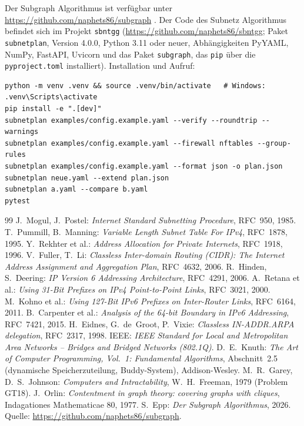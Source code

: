 \documentclass[a4paper,12pt, twoside]{report}
\theoremstyle{definition}
\begin{document}
Der Subgraph Algorithmus ist verfügbar unter \url{https://github.com/naphets86/subgraph} \cite{epp26}. Der Code des Subnetz Algorithmus befindet sich im Projekt \texttt{sbntgg} (\url{https://github.com/naphets86/sbntgg}; Paket \texttt{subnetplan}, Version 4.0.0, Python 3.11 oder neuer, Abhängigkeiten PyYAML, NumPy, FastAPI, Uvicorn und das Paket \texttt{subgraph}, das \texttt{pip} über die \texttt{pyproject.toml} installiert). Installation und Aufruf:
\begin{lstlisting}[language={}, numbers=none, basicstyle=\ttfamily\scriptsize]
python -m venv .venv && source .venv/bin/activate   # Windows: .venv\Scripts\activate
pip install -e ".[dev]"
subnetplan examples/config.example.yaml --verify --roundtrip --warnings
subnetplan examples/config.example.yaml --firewall nftables --group-rules
subnetplan examples/config.example.yaml --format json -o plan.json
subnetplan neue.yaml --extend plan.json
subnetplan a.yaml --compare b.yaml
pytest
\end{lstlisting}

\begin{thebibliography}{99}
 J.~Mogul, J.~Postel: \emph{Internet Standard Subnetting Procedure}, RFC~950, 1985.
 T.~Pummill, B.~Manning: \emph{Variable Length Subnet Table For IPv4}, RFC~1878, 1995.
 Y.~Rekhter et al.: \emph{Address Allocation for Private Internets}, RFC~1918, 1996.
 V.~Fuller, T.~Li: \emph{Classless Inter-domain Routing (CIDR): The Internet Address Assignment and Aggregation Plan}, RFC~4632, 2006.
 R.~Hinden, S.~Deering: \emph{IP Version 6 Addressing Architecture}, RFC~4291, 2006.
 A.~Retana et al.: \emph{Using 31-Bit Prefixes on IPv4 Point-to-Point Links}, RFC~3021, 2000.
 M.~Kohno et al.: \emph{Using 127-Bit IPv6 Prefixes on Inter-Router Links}, RFC~6164, 2011.
 B.~Carpenter et al.: \emph{Analysis of the 64-bit Boundary in IPv6 Addressing}, RFC~7421, 2015.
 H.~Eidnes, G.~de~Groot, P.~Vixie: \emph{Classless IN-ADDR.ARPA delegation}, RFC~2317, 1998.
 IEEE: \emph{IEEE Standard for Local and Metropolitan Area Networks -- Bridges and Bridged Networks (802.1Q)}.
 D.~E.~Knuth: \emph{The Art of Computer Programming, Vol.~1: Fundamental Algorithms}, Abschnitt~2.5 (dynamische Speicherzuteilung, Buddy-System), Addison-Wesley.
 M.~R.~Garey, D.~S.~Johnson: \emph{Computers and Intractability}, W.~H.~Freeman, 1979 (Problem GT18).
 J.~Orlin: \emph{Contentment in graph theory: covering graphs with cliques}, Indagationes Mathematicae 80, 1977.
 S.~Epp: \emph{Der Subgraph Algorithmus}, 2026. Quelle: \url{https://github.com/naphets86/subgraph}.
\end{thebibliography}
\end{document}
